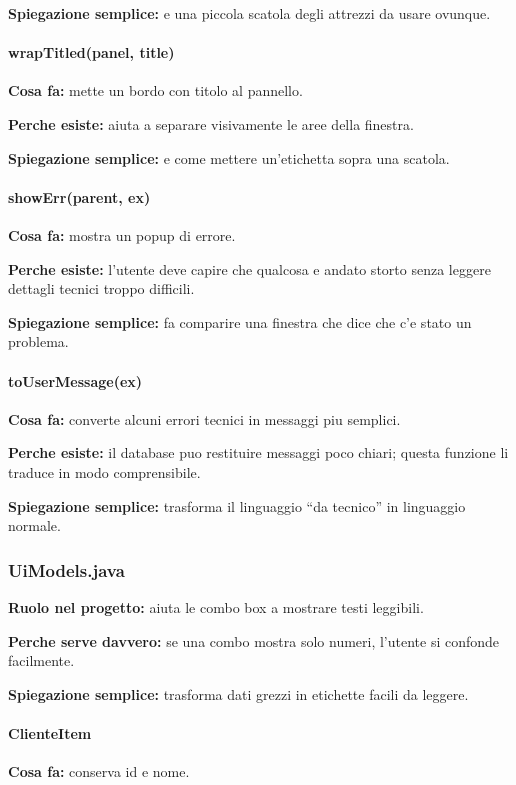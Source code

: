 \documentclass[12pt,a4paper]{article}
\begin{document}
\textbf{Spiegazione semplice:} e una piccola scatola degli attrezzi da usare ovunque.

\paragraph{wrapTitled(panel, title)}
\textbf{Cosa fa:} mette un bordo con titolo al pannello.

\textbf{Perche esiste:} aiuta a separare visivamente le aree della finestra.

\textbf{Spiegazione semplice:} e come mettere un'etichetta sopra una scatola.

\paragraph{showErr(parent, ex)}
\textbf{Cosa fa:} mostra un popup di errore.

\textbf{Perche esiste:} l'utente deve capire che qualcosa e andato storto senza leggere dettagli tecnici troppo difficili.

\textbf{Spiegazione semplice:} fa comparire una finestra che dice che c'e stato un problema.

\paragraph{toUserMessage(ex)}
\textbf{Cosa fa:} converte alcuni errori tecnici in messaggi piu semplici.

\textbf{Perche esiste:} il database puo restituire messaggi poco chiari; questa funzione li traduce in modo comprensibile.

\textbf{Spiegazione semplice:} trasforma il linguaggio ``da tecnico'' in linguaggio normale.

\subsubsection*{UiModels.java}
\textbf{Ruolo nel progetto:} aiuta le combo box a mostrare testi leggibili.

\textbf{Perche serve davvero:} se una combo mostra solo numeri, l'utente si confonde facilmente.

\textbf{Spiegazione semplice:} trasforma dati grezzi in etichette facili da leggere.

\paragraph{ClienteItem}
\textbf{Cosa fa:} conserva id e nome.
\end{document}
